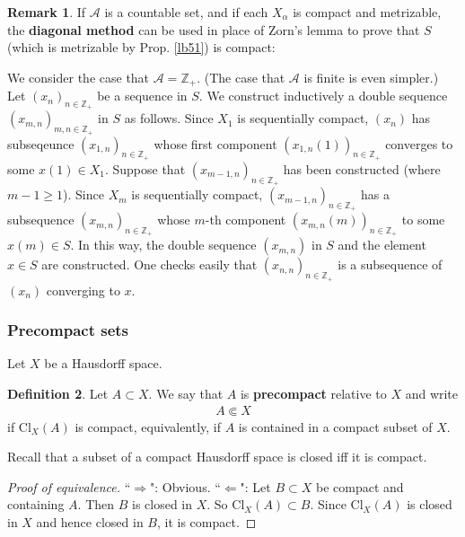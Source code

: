 \documentclass[12pt,b5paper,notitlepage]{article}
\theoremstyle{definition}
\newtheorem{df}{Definition}[section]
\newtheorem{rem}[df]{Remark}
\theoremstyle{plain}
\newcommand{\scr}{\mathscr}
\newcommand{\Zbb}{\mathbb Z}
\newcommand{\Cl}{\mathrm{Cl}}
\newcommand{\hqed}{\hfill\qedsymbol}
\numberwithin{equation}{section}
\begin{document}
\begin{rem}\label{lb52}
If $\scr A$ is a countable set, and if each $X_\alpha$ is compact and metrizable, the \textbf{diagonal method}  can be used in place of Zorn's lemma to prove that $S$ (which is metrizable by Prop. \ref{lb51}) is compact:

We consider the case that $\scr A=\Zbb_+$. (The case that $\scr A$ is finite is even simpler.) Let $(x_n)_{n\in\Zbb_+}$ be a sequence in $S$. We construct inductively a double sequence $(x_{m,n})_{m,n\in\Zbb_+}$ in $S$ as follows. Since $X_1$ is sequentially compact, $(x_n)$ has subseqeunce $(x_{1,n})_{n\in\Zbb_+}$ whose first component $(x_{1,n}(1))_{n\in\Zbb_+}$ converges to some $x(1)\in X_1$. Suppose that $(x_{m-1,n})_{n\in\Zbb_+}$ has been constructed (where $m-1\geq 1$). Since $X_m$ is sequentially compact, $(x_{m-1,n})_{n\in\Zbb_+}$ has a subsequence $(x_{m,n})_{n\in\Zbb_+}$ whose $m$-th component $(x_{m,n}(m))_{n\in\Zbb_+}$ to some $x(m)\in S$. In this way, the double sequence $(x_{m,n})$ in $S$ and the element $x\in S$ are constructed. One checks easily that $(x_{n,n})_{n\in\Zbb_+}$ is a subsequence of $(x_n)$ converging to $x$.  \hqed 
\end{rem}

















\subsubsection{Precompact sets}


Let $X$ be a Hausdorff space. 

\begin{df}
Let $A\subset X$. We say that $A$ is \textbf{precompact} relative to $X$ and write 
\begin{align*}
A\Subset X
\end{align*}
if $\Cl_X(A)$ is compact, equivalently, if $A$ is contained in a compact subset of $X$.
\end{df}

Recall that a subset of a compact Hausdorff space is closed iff it is compact.

\begin{proof}[Proof of equivalence]
``$\Rightarrow$": Obvious. ``$\Leftarrow$": Let $B\subset X$ be compact and containing $A$. Then $B$ is closed in $X$. So $\Cl_X(A)\subset B$. Since $\Cl_X(A)$ is closed in $X$ and hence closed in $B$, it is compact.
\end{proof}
\end{document}
